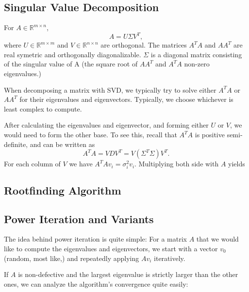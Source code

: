 \documentclass[5pt, a4paper]{article}
\begin{document}
    \subsection*{Singular Value Decomposition}
    \begin{tcolorbox}[title=Singular Value Decomposition]
        For $A \in \mathbb{R}^{m \times n}$, \[
            A = U \Sigma V^T
        ,\] 
        where $U \in \mathbb{R}^{m \times m}$ and $V \in \mathbb{R}^{n \times
        n}$ are orthogonal. The matrices $A^{T}A$ and $AA^{T}$ are real symetric
        and orthogonally diagonalizable. $\Sigma$ is a diagonal matrix consisting
        of the singular value of A (the square root of $AA^{T}$ and $A^{T}A$
        non-zero eigenvalues.)
    \end{tcolorbox}
    When decomposing a matrix with SVD, we typically try to solve either
    $A^{T}A$ or $AA^{T}$ for their eigenvalues and eigenvectors. Typically, we
    choose whichever is least complex to compute.

    After calculating the eigenvalues and eigenvector, and forming either $U$ or
     $V$, we would need to form the other base. To see this, recall that
     $A^{T}A$ is positive semi-definite, and can be written as \[
         A^{T}A = VDV^{T} = V(\Sigma^{T} \Sigma)V^{T}.
    \]
    For each column of $V$ we have  $A^{T}A v_i = \sigma_i^2 v_i$. Multiplying
    both side with $A$ yields 

     \subsection*{Rootfinding Algorithm}
     \subsection*{Power Iteration and Variants}
     The idea behind power iteration is quite simple: For a matrix $A$ that we
     would like to compute the eigenvalues and eigenvectors, we start with a
     vector $v_0$ (random, most like,) and repeatedly applying $Av_i$
     iteratively. 

     If  $A$ is non-defective and the largest eigenvalue is strictly larger than
     the other ones, we can analyze the algorithm's convergence quite easily: 
\end{document}
